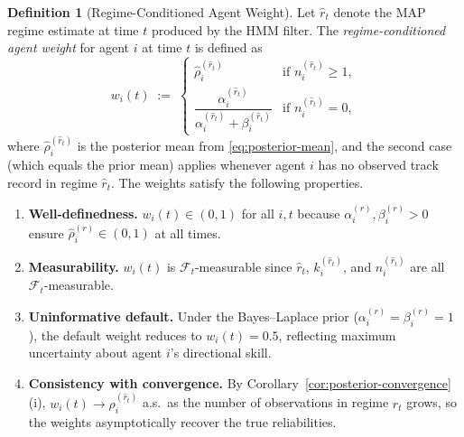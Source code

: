 \documentclass[12pt,openany]{book}
\numberwithin{equation}{chapter}
\theoremstyle{plain}
\theoremstyle{definition}
\newtheorem{definition}[theorem]{Definition}
\theoremstyle{remark}
\numberwithin{equation}{chapter}
\theoremstyle{plain}
\begin{document}
\begin{definition}[Regime-Conditioned Agent Weight]
\label{def:regime-weight}
Let $\hat{r}_t$ denote the MAP regime estimate at time $t$
produced by the HMM filter.  The \emph{regime-conditioned agent
weight} for agent $i$ at time $t$ is defined as
\begin{equation}
  w_i(t) \;:=\;
  \begin{cases}
    \hat{\rho}_i^{(\hat{r}_t)}
    & \text{if } n_i^{(\hat{r}_t)} \geq 1,\\[6pt]
    \dfrac{\alpha_i^{(\hat{r}_t)}}
          {\alpha_i^{(\hat{r}_t)} + \beta_i^{(\hat{r}_t)}}
    & \text{if } n_i^{(\hat{r}_t)} = 0,
  \end{cases}
  \label{eq:regime-weight}
\end{equation}
where $\hat{\rho}_i^{(\hat{r}_t)}$ is the posterior mean from
\eqref{eq:posterior-mean}, and the second case (which equals the
prior mean) applies whenever agent $i$ has no observed track
record in regime $\hat{r}_t$.  The weights satisfy the following
properties.
\begin{enumerate}
  \item[\textup{(i)}] \textbf{Well-definedness.}
        $w_i(t) \in (0,1)$ for all $i,t$ because
        $\alpha_i^{(r)}, \beta_i^{(r)} > 0$ ensure
        $\hat{\rho}_i^{(r)} \in (0,1)$ at all times.

  \item[\textup{(ii)}] \textbf{Measurability.}
        $w_i(t)$ is $\mathcal{F}_t$-measurable since
        $\hat{r}_t$, $k_i^{(\hat{r}_t)}$, and
        $n_i^{(\hat{r}_t)}$ are all $\mathcal{F}_t$-measurable.

  \item[\textup{(iii)}] \textbf{Uninformative default.}
        Under the Bayes--Laplace prior
        ($\alpha_i^{(r)} = \beta_i^{(r)} = 1$), the default
        weight reduces to $w_i(t) = 0.5$, reflecting
        maximum uncertainty about agent $i$'s directional skill.

  \item[\textup{(iv)}] \textbf{Consistency with convergence.}
        By Corollary~\ref{cor:posterior-convergence}(i),
        $w_i(t) \to \rho_i^{(\hat{r}_t)}$ a.s.\ as the number
        of observations in regime $\hat{r}_t$ grows, so the
        weights asymptotically recover the true reliabilities.
\end{enumerate}
\end{definition}

\end{document}
